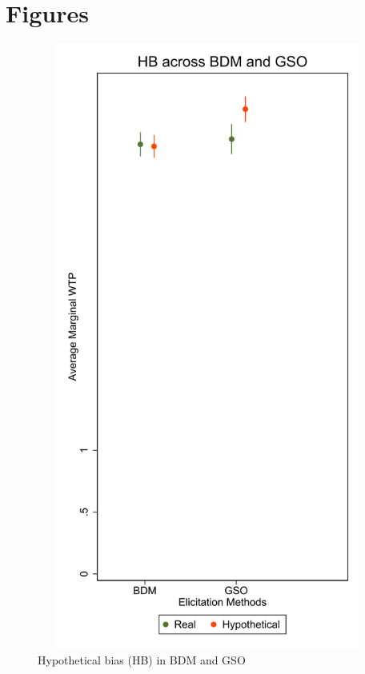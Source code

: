 \documentclass[12pt]{article}
\begin{document}
\clearpage

\section{Figures}

\begin{figure}[H]
    \centering
  \includegraphics[width=15cm, height=20cm]{Model50.pdf}
    \caption{ Hypothetical bias (HB) in BDM and GSO}
    \label{fig:margin_hypo}
\end{figure}
\end{document}
